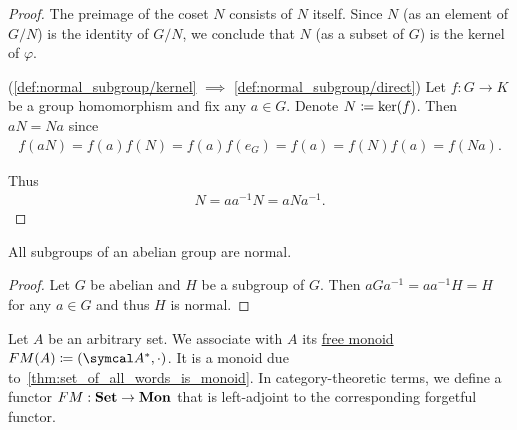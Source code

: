 \begin{proof}
  The preimage of the coset $N$ consists of $N$ itself. Since $N$ (as an element of $G / N$) is the identity of $G / N$, we conclude that $N$ (as a subset of $G$) is the kernel of $\varphi$.

  (\ref{def:normal_subgroup/kernel} $\implies$ \ref{def:normal_subgroup/direct}) Let $f: G \to K$ be a group homomorphism and fix any $a \in G$. Denote $N \coloneqq \operatorname{ker}(f)$. Then $aN = Na$ since
  \begin{align*}
    f(aN)
    =
    f(a) f(N)
    =
    f(a) f(e_G)
    =
    f(a)
    =
    f(N) f(a)
    =
    f(Na).
  \end{align*}

  Thus
  \begin{align*}
    N = aa^{-1}N = aNa^{-1}.
  \end{align*}
\end{proof}

\begin{proposition}\label{thm:abelian_normal_subgroups}
  All subgroups of an abelian group are normal.
\end{proposition}
\begin{proof}
  Let $G$ be abelian and $H$ be a subgroup of $G$. Then $aGa^{-1} = aa^{-1}H = H$ for any $a \in G$ and thus $H$ is normal.
\end{proof}

\begin{definition}\label{def:free_monoid}\cite[306]{Knapp2016BAlg}
  Let $A$ be an arbitrary set. We associate with $A$ its \ul{free monoid} $FM(A) \coloneqq (\Cal{A}^{*}, \cdot)$. It is a monoid due to~\cref{thm:set_of_all_words_is_monoid}. In category-theoretic terms, we define a functor $FM: \operatorname{\mathbf{Set}} \to \operatorname{\mathbf{Mon}}$ that is left-adjoint to the corresponding forgetful functor.
\end{definition}

